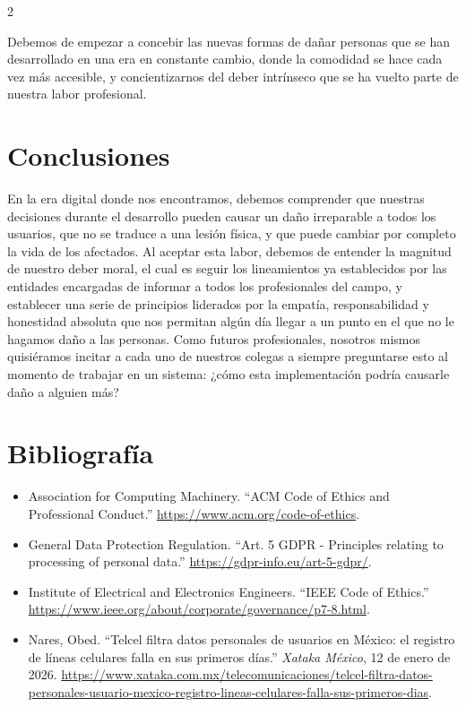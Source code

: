 \documentclass[10pt,spanish,Letterpaper,openany]{book}
\newif\ifsuppresschapter
\newif\ifsuppressbackground
\begin{document}
\begin {multicols}{2}

Debemos de empezar a concebir las nuevas formas de dañar personas que se han desarrollado en una era en constante cambio, donde la comodidad se hace cada vez más accesible, y concientizarnos del deber intrínseco que se ha vuelto parte de nuestra labor profesional.

\section{Conclusiones}\label{conclusiones-11}

En la era digital donde nos encontramos, debemos comprender que nuestras decisiones durante el desarrollo pueden causar un daño irreparable a todos los usuarios, que no se traduce a una lesión física, y que puede cambiar por completo la vida de los afectados. Al aceptar esta labor, debemos de entender la magnitud de nuestro deber moral, el cual es seguir los lineamientos ya establecidos por las entidades encargadas de informar a todos los profesionales del campo, y establecer una serie de principios liderados por la empatía, responsabilidad y honestidad absoluta que nos permitan algún día llegar a un punto en el que no le hagamos daño a las personas. Como futuros profesionales, nosotros mismos quisiéramos incitar a cada uno de nuestros colegas a siempre preguntarse esto al momento de trabajar en un sistema: ¿cómo esta implementación podría causarle daño a alguien más?

\section{Bibliografía}\label{bibliografuxeda-17}

\begin{itemize}
\item
  Association for Computing Machinery. ``ACM Code of Ethics and Professional Conduct.'' \url{https://www.acm.org/code-of-ethics}.
\item
  General Data Protection Regulation. ``Art. 5 GDPR - Principles relating to processing of personal data.'' \url{https://gdpr-info.eu/art-5-gdpr/}.
\item
  Institute of Electrical and Electronics Engineers. ``IEEE Code of Ethics.'' \url{https://www.ieee.org/about/corporate/governance/p7-8.html}.
\item
  Nares, Obed. ``Telcel filtra datos personales de usuarios en México: el registro de líneas celulares falla en sus primeros días.'' \emph{Xataka México}, 12 de enero de 2026. \url{https://www.xataka.com.mx/telecomunicaciones/telcel-filtra-datos-personales-usuario-mexico-registro-lineas-celulares-falla-sus-primeros-dias}.
\end{itemize}

\end {multicols}

\medskip

\suppresschapterfalse



\clearpage
\suppressbackgroundtrue

\suppressbackgroundfalse
\end{document}

